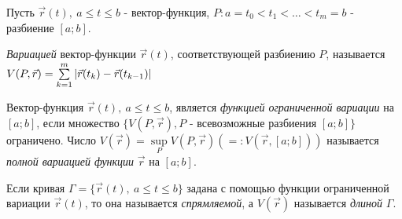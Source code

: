 \begin{definition}
	Пусть $\vec{r}(t),\ a \le t \le b$ - вектор-функция, $P: a = t_0 < t_1 < \ldots < t_m = b$ - разбиение $[a; b]$.
	
	\textit{Вариацией} вектор-функции $\vec{r}(t)$, соответствующей разбиению $P$, называется $V(P, \vec{r}) = \sum\limits_{k = 1}^m |\vec{r}(t_k) - \vec{r}(t_{k - 1})|$
\end{definition}

\begin{definition}
	Вектор-функция $\vec{r}(t),\ a \le t \le b$, является \textit{функцией ограниченной вариации} на $[a; b]$, если множество $\{V(P, \vec{r}), P \text{ - всевозможные разбиения }[a; b]\}$ ограничено. Число $V(\vec{r}) = \sup\limits_{P} V(P, \vec{r})\left(=: V(\vec{r}, [a; b])\right)$ называется \textit{полной вариацией функции} $\vec{r}$ на $[a; b]$.
\end{definition}

\begin{definition}
	Если кривая $\Gamma = \{\vec{r}(t),\ a \le t \le b\}$ задана с помощью функции ограниченной вариации $\vec{r}(t)$, то она называется \textit{спрямляемой}, а $V(\vec{r})$ называется \textit{длиной} $\Gamma$.
\end{definition}


